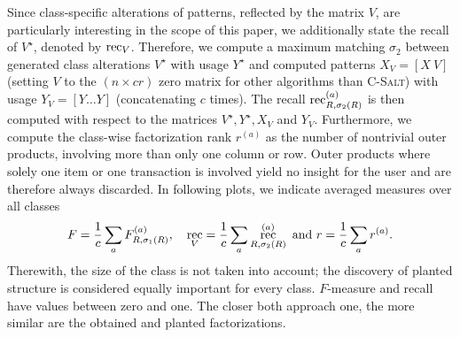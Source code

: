 Since class-specific alterations of patterns, reflected by the matrix $V$, are particularly interesting in the scope of this paper, we additionally state the recall of $V^\star$, denoted by $\operatorname*{rec}_V$. Therefore, we compute a maximum matching $\sigma_2$ between generated class alterations $V^\star$ with usage $Y^\star$ and computed patterns $X_V=[X\ V]$ (setting $V$ to the $(n\times cr)$ zero matrix for other algorithms than \textsc{C-Salt}) with usage $Y_V=[Y \ldots Y]$ (concatenating $c$ times). The recall $\operatorname*{rec}_{R,\sigma_2(R)}^{(a)}$ is then computed with respect to the matrices $V^\star, Y^\star, X_V$ and $Y_V$.
Furthermore, we compute the class-wise factorization rank $r^{(a)}$ as the number of nontrivial outer products, involving more than only one column or row. Outer products where solely one item or one transaction is involved yield no insight for the user and are therefore always discarded. In following plots, we indicate averaged measures over all classes
\[ F=\frac{1}{c}\sum_a F^{(a)}_{R,\sigma_1(R)}, \quad \operatorname*{rec}_V=\frac{1}{c}\sum_a \operatorname*{rec}^{(a)}_{R,\sigma_2(R)} \text{ and } r=\frac{1}{c}\sum_a r^{(a)}.
\]
Therewith, the size of the class is not taken into account; the discovery of planted structure is considered equally important for every class.
$F$-measure and recall have values between zero and one. The closer both approach one, the more similar are the obtained and planted factorizations.

